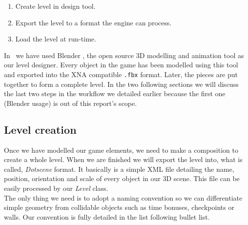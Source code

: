 \begin{enumerate}
	\item Create level in design tool.
	\item Export the level to a format the engine can process.
	\item Load the level at run-time.
\end{enumerate}

In \game\ we have used Blender \cite{hess07}, the open source 3D modelling and animation
tool as our level designer. Every object in the game has been modelled using this tool
and exported into the XNA compatible \texttt{.fbx} format. Later, the pieces are put together
to form a complete level. In the two following sections we will discuss the last two steps
in the workflow we detailed earlier because the first one (Blender usage) is out of this
report's scope.

\subsection{Level creation}

Once we have modelled our game elements, we need to make a composition to
create a whole level. When we are finished we will export the level into, what
is called, \textit{Dotscene} format. It basically is a simple XML file detailing
the name, position, orientation and scale of every object in our 3D scene. This
file can be easily processed by our \textit{Level} class.\\

The only thing we need is to adopt a naming convention so we can differentiate
simple geometry from collidable objects such as time bonuses, checkpoints or walls.
Our convention is fully detailed in the list following bullet list.

